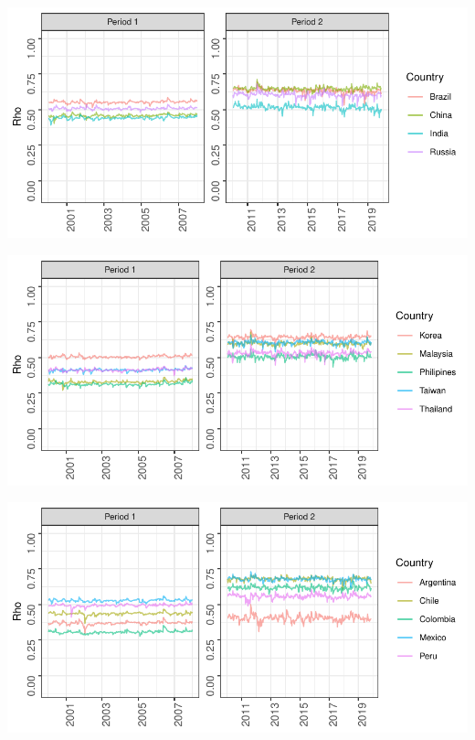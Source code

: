 \documentclass[11pt,preprint, authoryear]{elsarticle}
\let\origfigure\figure
\let\endorigfigure\endfigure
\renewenvironment{figure}[1][2] {
    \expandafter\origfigure\expandafter[H]
} {
    \endorigfigure
}
\numberwithin{equation}{section}
\numberwithin{figure}{section}
\numberwithin{table}{section}
\begin{document}
\begin{figure}[H]

{\centering \includegraphics{Template_files/figure-latex/dcc1-1} 

}

\caption{South Africa-BRICS DCC \label{dcc1}}\label{fig:dcc1}
\end{figure}
\begin{figure}[H]

{\centering \includegraphics{Template_files/figure-latex/dcc2-1} 

}

\caption{South Africa-Asia DCC \label{dcc2}}\label{fig:dcc2}
\end{figure}
\begin{figure}[H]

{\centering \includegraphics{Template_files/figure-latex/dcc3-1} 

}

\caption{South Africa-Latin America DCC \label{dcc3}}\label{fig:dcc3}
\end{figure}
\end{document}
